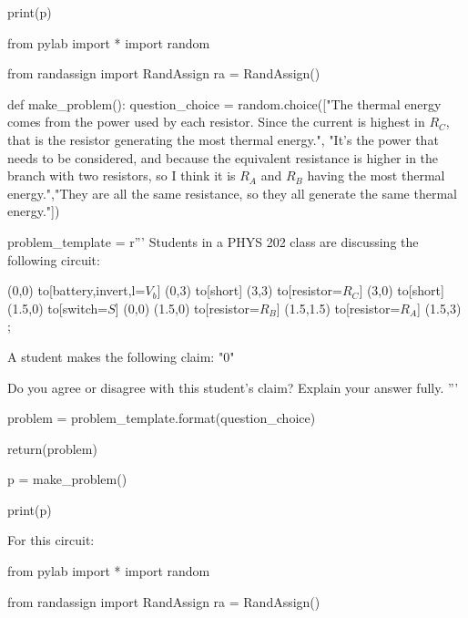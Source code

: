 \documentclass[12pt]{exam}
\begin{document}
\begin{questions}
\begin{pycode}
print(p)

\end{pycode}

\newpage
\question

\begin{pycode}

from pylab import *
import random

from randassign import RandAssign
ra = RandAssign()

def make_problem():
	question_choice = random.choice(["The thermal energy comes from the power used by each resistor. Since the current is highest in $R_C$, that is the resistor generating the most thermal energy.", "It’s the power that needs to be considered, and because the equivalent resistance is higher in the branch with two resistors, so I think it is $R_A$ and $R_B$ having the most thermal energy.","They are all the same resistance, so they all generate the same thermal energy."])
	
	problem_template = r'''
	Students in a PHYS 202 class are discussing the following circuit:
	
	\begin{{figure}}[!h]
	\begin{{center}}\begin{{circuitikz}}\draw
		(0,0) to[battery,invert,l=$V_b$] (0,3)
		to[short] (3,3)
		to[resistor=$R_C$] (3,0)
		to[short] (1.5,0)
		to[switch=$S$] (0,0)
		(1.5,0) to[resistor=$R_B$] (1.5,1.5)
		to[resistor=$R_A$] (1.5,3)
	;\end{{circuitikz}}\end{{center}}
	\end{{figure}}
	A student makes the following claim:
	"{{{0}}}"
	
	Do you agree or disagree with this student's claim? Explain your answer fully.
	'''
	
	problem = problem_template.format(question_choice)
	
	return(problem)
	
p = make_problem()

print(p)

	
\end{pycode}

\newpage

\question For this circuit:


\begin{pycode}
from pylab import *
import random

from randassign import RandAssign
ra = RandAssign()


\end{pycode}
\end{questions}
\end{document}

